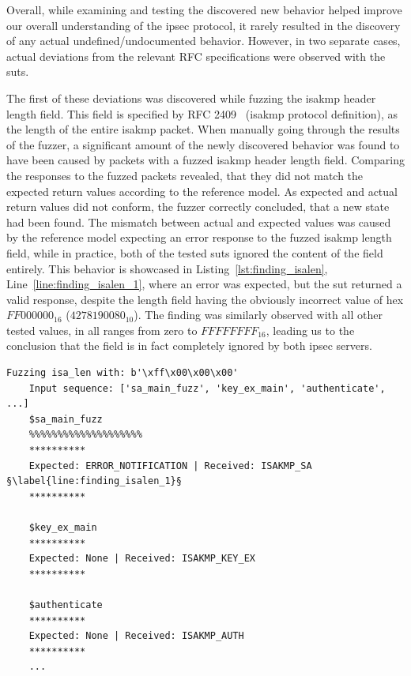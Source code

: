 Overall, while examining and testing the discovered new behavior helped improve our overall understanding of the \ac{ipsec} protocol, it rarely resulted in the discovery of any actual undefined/undocumented behavior. However, in two separate cases, actual deviations from the relevant RFC specifications were observed with the \acp{sut}. 

The first of these deviations was discovered while fuzzing the \ac{isakmp} header length field. This field is specified by RFC 2409~\cite{rfc:isakmp} (\ac{isakmp} protocol definition), as the length of the entire \ac{isakmp} packet. When manually going through the results of the fuzzer, a significant amount of the newly discovered behavior was found to have been caused by packets with a fuzzed \ac{isakmp} header length field. Comparing the responses to the fuzzed packets revealed, that they did not match the expected return values according to the reference model. As expected and actual return values did not conform, the fuzzer correctly concluded, that a new state had been found. The mismatch between actual and expected values was caused by the reference model expecting an error response to the fuzzed \ac{isakmp} length field, while in practice, both of the tested \acp{sut} ignored the content of the field entirely. This behavior is showcased in Listing~\ref{lst:finding_isalen}, Line~\ref{line:finding_isalen_1}, where an error was expected, but the \ac{sut} returned a valid response, despite the length field having the obviously incorrect value of hex $FF000000_{16}$ ($4278190080_{10}$). The finding was similarly observed with all other tested values, in all ranges from zero to $FFFFFFFF_{16}$, leading us to the conclusion that the field is in fact completely ignored by both \ac{ipsec} servers.

\begin{lstlisting}[float=h, caption=Discovered finding showing the ISAKMP length field being ignored., label=lst:finding_isalen, escapechar=§]
	Fuzzing isa_len with: b'\xff\x00\x00\x00'
	Input sequence: ['sa_main_fuzz', 'key_ex_main', 'authenticate', ...]
	$sa_main_fuzz
	%%%%%%%%%%%%%%%%%%%%
	**********
	Expected: ERROR_NOTIFICATION | Received: ISAKMP_SA §\label{line:finding_isalen_1}§
	**********
	
	$key_ex_main
	**********
	Expected: None | Received: ISAKMP_KEY_EX
	**********
	
	$authenticate
	**********
	Expected: None | Received: ISAKMP_AUTH
	**********
	...
\end{lstlisting}

